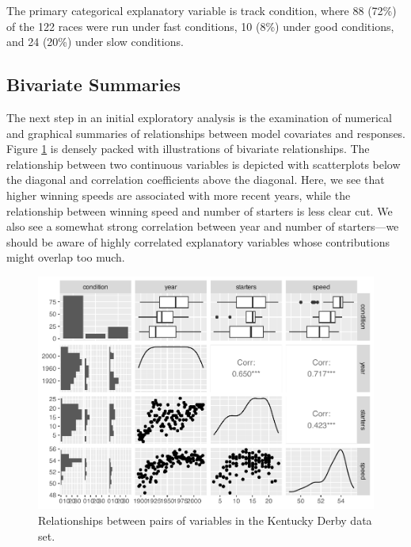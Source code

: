 \documentclass[
]{krantz}
\begin{document}
The primary categorical explanatory variable is track condition, where 88 (72\%) of the 122 races were run under fast conditions, 10 (8\%) under good conditions, and 24 (20\%) under slow conditions.

\hypertarget{bivariate-summaries}{%
\subsection{Bivariate Summaries}\label{bivariate-summaries}}

The next step in an initial exploratory analysis is the examination of numerical and graphical summaries of relationships between model covariates and responses. Figure \ref{fig:bivariate} is densely packed with illustrations of bivariate relationships. The relationship between two continuous variables is depicted with scatterplots below the diagonal and correlation coefficients above the diagonal. Here, we see that higher winning speeds are associated with more recent years, while the relationship between winning speed and number of starters is less clear cut. We also see a somewhat strong correlation between year and number of starters---we should be aware of highly correlated explanatory variables whose contributions might overlap too much.

\begin{figure}

{\centering \includegraphics[width=0.9\linewidth]{bookdown-BeyondMLR_files/figure-latex/bivariate-1} 

}

\caption{Relationships between pairs of variables in the Kentucky Derby data set.}\label{fig:bivariate}
\end{figure}
\end{document}
